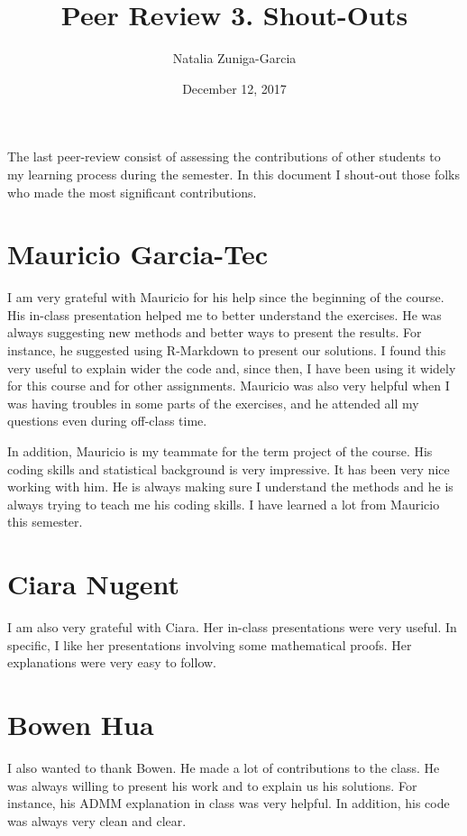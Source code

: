 \documentclass[11 pt]{article}
\author{Natalia Zuniga-Garcia}
\title{Peer Review 3. Shout-Outs}
\date{December 12, 2017}
\begin{document}
\maketitle

The last peer-review consist of assessing the contributions of other students to my learning process during the semester. In this document I shout-out those folks who made the most significant contributions. 

\section{Mauricio Garcia-Tec}

I am very grateful with Mauricio for his help since the beginning of the course. His in-class presentation helped me to better understand the exercises. He was always suggesting new methods and better ways to present the results. For instance, he suggested using R-Markdown to present our solutions. I found this very useful to explain wider the code and, since then, I have been using it widely for this course and for other assignments. Mauricio was also very helpful when I was having troubles in some parts of the exercises, and he attended all my questions even during off-class time. 

In addition, Mauricio is my teammate for the term project of the course. His coding skills and statistical background is very impressive. It has been very nice working with him. He is always making sure I understand the methods and he is always trying to teach me his coding skills. I have learned a lot from Mauricio this semester.


\section{Ciara Nugent}

I am also very grateful with Ciara. Her in-class presentations were very useful. In specific, I like her presentations involving some mathematical proofs. Her explanations were very easy to follow.

\section{Bowen Hua}
I also wanted to thank Bowen. He made a lot of contributions to the class. He was always willing to present his work and to explain us his solutions. For instance, his ADMM explanation in class was very helpful.  In addition, his code was always very clean and clear. 
\end{document}
